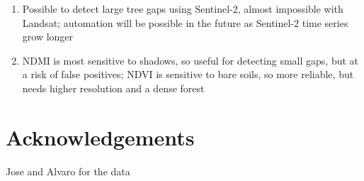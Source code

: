 \documentclass[a4paper,12pt]{scrbook}
\begin{document}
\begin{enumerate}
 \item Possible to detect large tree gaps using Sentinel-2, almost impossible with Landsat; automation will be possible in the future as Sentinel-2 time series grow longer
 \item \ac{NDMI} is most sensitive to shadows, so useful for detecting small gaps, but at a risk of false positives; \ac{NDVI} is sensitive to bare soils, so more reliable, but needs higher resolution and a dense forest
\end{enumerate}

\chapter{Acknowledgements}

Jose and Alvaro for the data

\printnoidxglossary[type=acronym]


\end{document}
